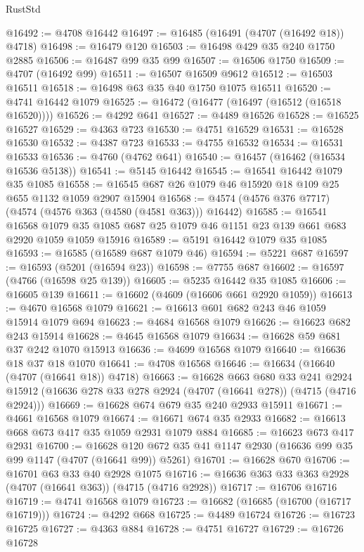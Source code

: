 \begin{lexlean}{RustStd}
\begin{coremodule}
@16492 := @4708 @16442
@16497 := @16485 (@16491 (@4707 (@16492 @18)) @4718)
@16498 := @16479 @120
@16503 := @16498 @429 @35 @240 @1750 @2885
@16506 := @16487 @99 @35 @99
@16507 := @16506 @1750
@16509 := @4707 (@16492 @99)
@16511 := @16507 @16509 @9612
@16512 := @16503 @16511
@16518 := @16498 @63 @35 @40 @1750 @1075 @16511
@16520 := @4741 @16442 @1079
@16525 := @16472 (@16477 (@16497 (@16512 (@16518 @16520))))
@16526 := @4292 @641
@16527 := @4489 @16526
@16528 := @16525 @16527
@16529 := @4363 @723
@16530 := @4751 @16529
@16531 := @16528 @16530
@16532 := @4387 @723
@16533 := @4755 @16532
@16534 := @16531 @16533
@16536 := @4760 (@4762 @641)
@16540 := @16457 (@16462 (@16534 @16536 @5138))
@16541 := @5145 @16442
@16545 := @16541 @16442 @1079 @35 @1085
@16558 := @16545 @687 @26 @1079 @46 @15920 @18 @109 @25 @655 @1132 @1059 @2907 @15904
@16568 := @4574 (@4576 @376 @7717) (@4574 (@4576 @363 (@4580 (@4581 @363))) @16442)
@16585 := @16541
    @16568
    @1079
    @35
    @1085
    @687
    @25
    @1079
    @46
    @1151
    @23
    @139
    @661
    @683
    @2920
    @1059
    @1059
    @15916
@16589 := @5191 @16442 @1079 @35 @1085
@16593 := @16585 (@16589 @687 @1079 @46)
@16594 := @5221 @687
@16597 := @16593 (@5201 (@16594 @23))
@16598 := @7755 @687
@16602 := @16597 (@4766 (@16598 @25 @139))
@16605 := @5235 @16442 @35 @1085
@16606 := @16605 @139
@16611 := @16602 (@4609 (@16606 @661 @2920 @1059))
@16613 := @4670 @16568 @1079
@16621 := @16613 @601 @682 @243 @46 @1059 @15914 @1079 @694
@16623 := @4684 @16568 @1079
@16626 := @16623 @682 @243 @15914
@16628 := @4645 @16568 @1079
@16634 := @16628 @59 @681 @37 @242 @1070 @15913
@16636 := @4699 @16568 @1079
@16640 := @16636 @18 @37 @18 @1070
@16641 := @4708 @16568
@16646 := @16634 (@16640 (@4707 (@16641 @18)) @4718)
@16663 := @16628
    @663
    @680
    @33
    @241
    @2924
    @15912
    (@16636 @278 @33 @278 @2924 (@4707 (@16641 @278)) (@4715 (@4716 @2924)))
@16669 := @16628 @674 @679 @35 @240 @2933 @15911
@16671 := @4661 @16568 @1079
@16674 := @16671 @674 @35 @2933
@16682 := @16613 @668 @673 @417 @35 @1059 @2931 @1079 @884
@16685 := @16623 @673 @417 @2931
@16700 := @16628 @120 @672 @35 @41 @1147 @2930 (@16636 @99 @35 @99 @1147 (@4707 (@16641 @99)) @5261)
@16701 := @16628 @670
@16706 := @16701 @63 @33 @40 @2928 @1075
@16716 := @16636 @363 @33 @363 @2928 (@4707 (@16641 @363)) (@4715 (@4716 @2928))
@16717 := @16706 @16716
@16719 := @4741 @16568 @1079
@16723 := @16682 (@16685 (@16700 (@16717 @16719)))
@16724 := @4292 @668
@16725 := @4489 @16724
@16726 := @16723 @16725
@16727 := @4363 @884
@16728 := @4751 @16727
@16729 := @16726 @16728

\end{coremodule}
\end{lexlean}
